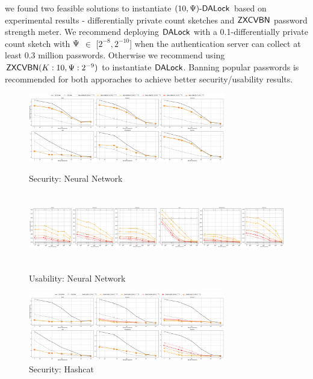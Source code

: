  we found two feasible solutions to instantiate $(10, \Psi)\text{-}\mathsf{DALock}$ based on experimental results - differentially private count sketches and $\mathsf{ZXCVBN}$ password strength meter. We recommend deploying $\mathsf{DALock}$ with a 0.1-differentially private count sketch with $\Psi$ $\in$ [$2^{-8},2^{-10}$] when the authentication server can collect at least 0.3 million passwords. Otherwise we recommend using $\mathsf{ZXCVBN}(K:10,\Psi:2^{-9})$ to instantiate $\mathsf{DALock}$. Banning popular passwords is recommended for both apporaches to achieve better security/usability results. 

\begin{figure}
	\includegraphics[width=\linewidth, height = 3cm]{Figures/Experiments/Attacker/SecurityNeuralNet}
	\vspace{-0.2in}
	\caption[Security: Neural Network Estimator]{Security: Neural Network}
	\label{fig:securityneuralnet}
	\includegraphics[width=\linewidth, height = 3cm]{Figures/Experiments/Utility/UsabilityNeuralNet}
	\vspace{-0.2in}
	\caption[Usability: Neural Network Estimator]{Usability: Neural Network}
	\label{fig:usabilityneuralnet}
		\includegraphics[width=\linewidth, height = 3cm]{Figures/Experiments/Attacker/SecurityHashcat}
		\vspace{-0.2in}
		\caption[Security: Hashcat Estimator]{Security: Hashcat}
		\label{fig:securityhashcat}
	

\end{figure}
